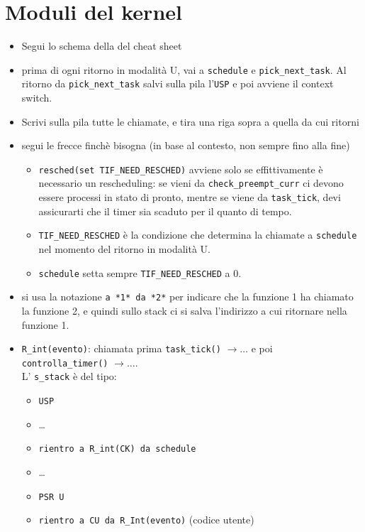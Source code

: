 \documentclass[12pt, a4paper]{report}
\begin{document}
\section*{Moduli del kernel}
\begin{itemize}
	\item Segui lo schema della del cheat sheet
	\item prima di ogni ritorno in modalità U, vai a \texttt{schedule} e
		\texttt{pick\_next\_task}. Al ritorno da \texttt{pick\_next\_task} salvi
		sulla pila l'\texttt{USP} e poi avviene il context switch.
	\item Scrivi sulla pila tutte le chiamate, e tira una riga sopra a quella da
		cui ritorni
	\item segui le frecce finchè bisogna (in base al contesto, non sempre fino
		alla fine)
		\begin{itemize}
			\item \texttt{resched(set TIF\_NEED\_RESCHED)} avviene solo se
				effittivamente è necessario un rescheduling: se vieni da
				\texttt{check\_preempt\_curr} ci devono essere processi in
				stato di pronto, mentre se viene da \texttt{task\_tick}, devi
				assicurarti che il timer sia scaduto per il quanto di tempo.
			\item \texttt{TIF\_NEED\_RESCHED} è la condizione che determina la
				chiamate a \texttt{schedule} nel momento del ritorno in
				modalità U.
			\item \texttt{schedule} setta sempre \texttt{TIF\_NEED\_RESCHED} a
				0.
		\end{itemize}
	\item si usa la notazione \texttt{a *1* da *2*} per indicare che la funzione
		1 ha chiamato la funzione 2, e quindi sullo stack ci si salva
		l'indirizzo a cui ritornare nella funzione 1.
	\item \texttt{R\_int(evento)}: chiamata prima \texttt{task\_tick()} $\to
			\dots$ e poi \texttt{controlla\_timer()} $\to \dots$.\\
		L' \texttt{s\_stack} è del tipo:
		\begin{itemize}
			\item \texttt{USP}
			\item \dots
			\item \texttt{rientro a R\_int(CK) da schedule}
			\item \dots
			\item \texttt{PSR U}
			\item \texttt{rientro a CU da R\_Int(evento)} (codice utente)
		\end{itemize}

\end{itemize}
\end{document}
